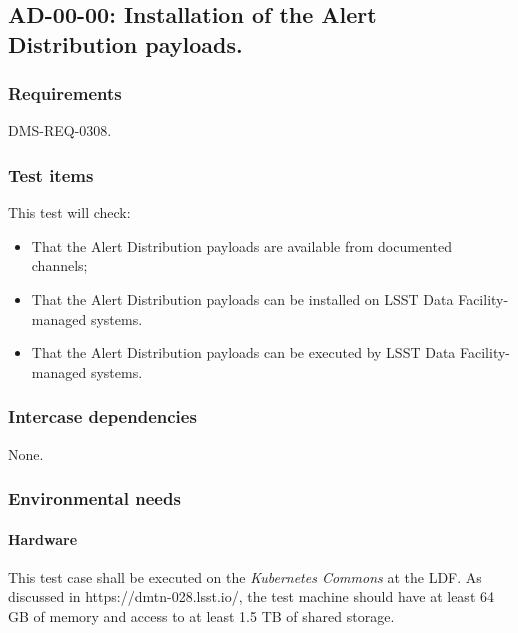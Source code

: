 \subsection{AD-00-00: Installation of the Alert Distribution payloads.}
\label{ad-00-00}

\subsubsection{Requirements}

DMS-REQ-0308.

\subsubsection{Test items}

This test will check:

\begin{itemize}

  \item{That the Alert Distribution payloads are available 
  from documented channels;}

  \item{That the Alert Distribution payloads can be installed on
  LSST Data Facility-managed systems.}

  \item{That the Alert Distribution payloads can be executed by
  LSST Data Facility-managed systems.}

\end{itemize}

\subsubsection{Intercase dependencies}

None.

\subsubsection{Environmental needs}

\paragraph{Hardware}

This test case shall be executed on the \textit{Kubernetes Commons} at the LDF. 
As discussed in https://dmtn-028.lsst.io/, the test machine should have at least 64 GB of memory and access to at least 1.5 TB of shared storage.

